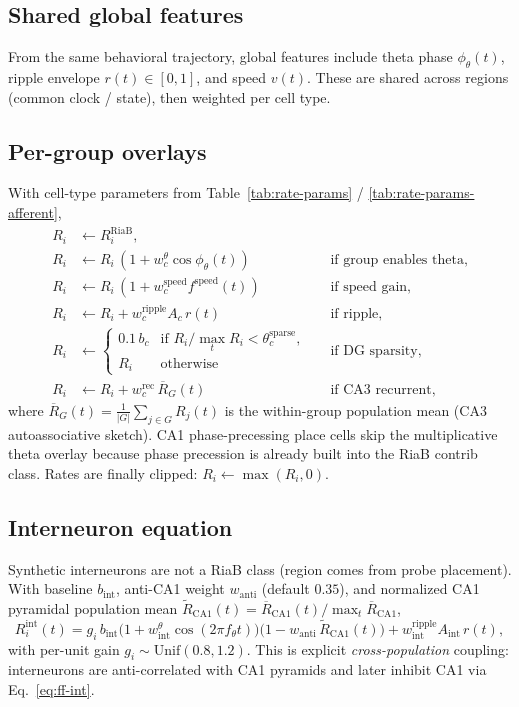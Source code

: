 \documentclass[11pt,a4paper]{article}
\begin{document}
\subsection{Shared global features}
From the same behavioral trajectory, global features include theta phase $\phi_\theta(t)$, ripple envelope $r(t)\in[0,1]$, and speed $v(t)$.
These are shared across regions (common clock / state), then weighted per cell type.

\subsection{Per-group overlays}
With cell-type parameters from Table~\ref{tab:rate-params} / \ref{tab:rate-params-afferent},
\begin{align}
  R_i &\leftarrow R_i^{\mathrm{RiaB}}, \\
  R_i &\leftarrow R_i\,(1 + w_c^{\theta}\cos\phi_\theta(t))
    && \text{if group enables theta}, \label{eq:dyn-theta}\\
  R_i &\leftarrow R_i\,(1 + w_c^{\mathrm{speed}} f^{\mathrm{speed}}(t))
    && \text{if speed gain}, \label{eq:dyn-speed}\\
  R_i &\leftarrow R_i + w_c^{\mathrm{ripple}} A_c\, r(t)
    && \text{if ripple}, \label{eq:dyn-ripple}\\
  R_i &\leftarrow
    \begin{cases}
      0.1\,b_c & \text{if } R_i / \max_t R_i < \theta_c^{\mathrm{sparse}}, \\
      R_i & \text{otherwise}
    \end{cases}
    && \text{if DG sparsity}, \label{eq:dyn-sparse}\\
  R_i &\leftarrow R_i + w_c^{\mathrm{rec}}\,\overline{R}_{G}(t)
    && \text{if CA3 recurrent}, \label{eq:dyn-rec}
\end{align}
where $\overline{R}_{G}(t)=\frac{1}{|G|}\sum_{j\in G} R_j(t)$ is the within-group population mean (CA3 autoassociative sketch).
CA1 phase-precessing place cells skip the multiplicative theta overlay because phase precession is already built into the RiaB contrib class.
Rates are finally clipped: $R_i\leftarrow\max(R_i,0)$.

\subsection{Interneuron equation}
Synthetic interneurons are not a RiaB class (region comes from probe placement).
With baseline $b_{\mathrm{int}}$, anti-CA1 weight $w_{\mathrm{anti}}$ (default $0.35$), and normalized CA1 pyramidal population mean
$\tilde R_{\mathrm{CA1}}(t)=\overline{R}_{\mathrm{CA1}}(t)/\max_t\overline{R}_{\mathrm{CA1}}$,
\begin{equation}
  R_i^{\mathrm{int}}(t)
  =
  g_i\, b_{\mathrm{int}}
  \bigl(1 + w_{\mathrm{int}}^{\theta}\cos(2\pi f_\theta t)\bigr)
  \bigl(1 - w_{\mathrm{anti}}\,\tilde R_{\mathrm{CA1}}(t)\bigr)
  +
  w_{\mathrm{int}}^{\mathrm{ripple}} A_{\mathrm{int}}\, r(t),
  \label{eq:ca1-int}
\end{equation}
with per-unit gain $g_i\sim\mathrm{Unif}(0.8,1.2)$.
This is explicit \emph{cross-population} coupling: interneurons are anti-correlated with CA1 pyramids and later inhibit CA1 via Eq.~\ref{eq:ff-int}.
\end{document}
